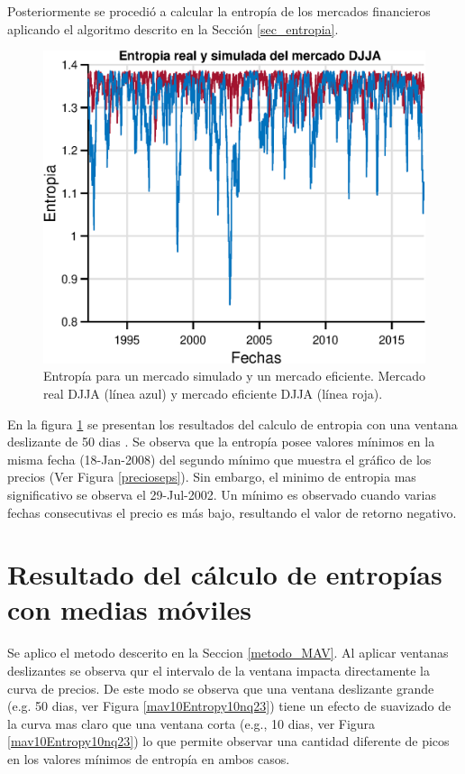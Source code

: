 {Posteriormente se procedió a calcular la entropía de los mercados financieros aplicando el algoritmo descrito en la Sección \ref{sec_entropia}.
\begin{figure}[h!]
	\centering
	\includegraphics[width=12cm]{figures/onlyentropyeps}
	\caption{Entropía para un mercado simulado y un mercado eficiente. Mercado real DJJA (línea azul) y mercado eficiente DJJA (línea roja).}
	\label{onlyentropyeps}
\end{figure}
En la figura \ref{onlyentropyeps} se presentan los resultados del calculo de entropia con una ventana deslizante de 50 dias	.
Se observa que la entropía posee valores mínimos en la misma fecha (18-Jan-2008) del segundo mínimo que muestra el gráfico de los precios (Ver Figura \ref{precioseps}). 
Sin embargo, el minimo de entropia mas significativo se observa el 29-Jul-2002.
Un mínimo es observado cuando varias fechas consecutivas el precio es más bajo, resultando el valor de retorno negativo. 


}

\section{Resultado del cálculo de entropías con medias móviles}
Se aplico el metodo descerito en la Seccion \ref{metodo_MAV}.
Al aplicar ventanas deslizantes se observa qur el intervalo de la ventana impacta directamente la curva de precios.
De este modo se observa que una ventana deslizante grande (e.g. 50 dias, ver  Figura \ref{mav10Entropy10nq23}) tiene un efecto de suavizado de la curva mas claro que una ventana corta (e.g., 10 dias, ver Figura \ref{mav10Entropy10nq23}) lo que permite observar una cantidad diferente de picos en los valores mínimos de entropía en ambos casos. 



